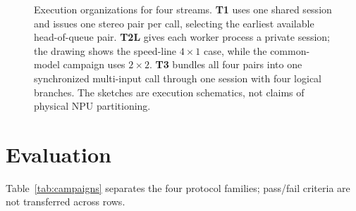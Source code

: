 \documentclass[sigconf,review,anonymous]{acmart}
\begin{document}
\begin{figure}[t]
\centering

\caption{Execution organizations for four streams. \textbf{T1} uses one shared session and issues one stereo pair per call, selecting the earliest available head-of-queue pair. \textbf{T2L} gives each worker process a private session; the drawing shows the speed-line $4\times1$ case, while the common-model campaign uses $2\times2$. \textbf{T3} bundles all four pairs into one synchronized multi-input call through one session with four logical branches. The sketches are execution schematics, not claims of physical NPU partitioning.}
\label{fig:orgs}
\end{figure}

\section{Evaluation}
Table~\ref{tab:campaigns} separates the four protocol families; pass/fail criteria are not transferred across rows.
\end{document}
